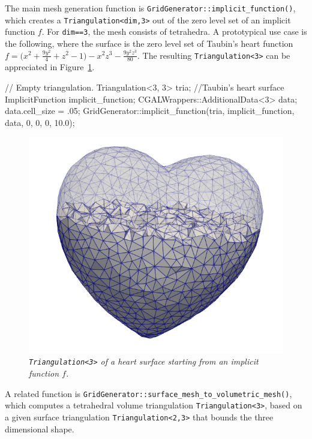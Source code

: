 \documentclass{ansarticle-preprint}
\begin{document}
The main mesh generation function is
\texttt{GridGenerator::implicit\_function()}, which creates a \texttt{Triangulation<dim,3>} out of the zero level set of an implicit function $f$. 
For \texttt{dim==3}, the mesh consists of tetrahedra. A prototypical use case is the following, where the surface is the zero level set of Taubin's heart function $f=\bigl ( x^2 + \frac{9y^2}{4} +z^2 -1 \bigr ) -x^2 z^3 - \frac{9y^2z^3}{80}$. The resulting \texttt{Triangulation<3>} can be appreciated in Figure~\ref{fig:heart_tria}.
\begin{c++}
// Empty triangulation.
Triangulation<3, 3>  tria;
//Taubin's heart surface
ImplicitFunction                implicit_function;
CGALWrappers::AdditionalData<3> data;
data.cell_size = .05;
GridGenerator::implicit_function(tria, implicit_function, data,
                                 {0, 0, 0}, 10.0);
\end{c++}

\begin{figure}
  \centering
  \includegraphics[width=.6\paperwidth]{png/heart_implicit.png}
  \caption{\it \texttt{Triangulation<3>} of a heart surface starting from an implicit function $f$. \label{fig:heart_tria}}
\end{figure}

A related function is
\texttt{GridGenerator::surface\_mesh\_to\_volumetric\_mesh()}, which
computes a tetrahedral volume triangulation \texttt{Triangulation<3>}, based on a
given surface triangulation \texttt{Triangulation<2,3>} that bounds
the three dimensional shape.
\end{document}

